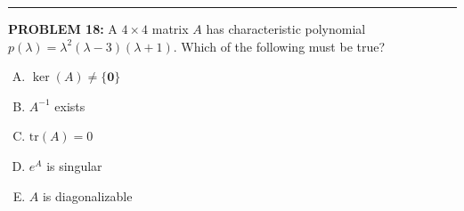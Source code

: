 \documentclass[12pt]{amsart}
\newcommand{\divider}{
  \vspace{-1em} %
  \noindent
  \raisebox{-0.15ex}{\textbullet}%
  \hspace{0.5em}%
  \rule[0.5ex]{0.95\textwidth}{1.0pt}%
  \hspace{0.5em}%
  \raisebox{-0.15ex}{\textbullet}%
  \vspace{0em} %
}
\begin{document}
%
%
%
%
%
%
%
%


\divider


{\bf PROBLEM 18:}
%
A $4 \times 4$ matrix $A$ has characteristic polynomial $p(\lambda) = \lambda^2(\lambda - 3)(\lambda + 1)$.
%
Which of the following must be true?
%
\begin{enumerate}[(A)]
\item $\ker(A) \neq \{\mathbf{0}\}$
\item $A^{-1}$ exists
\item $\text{tr}(A) = 0$
\item $e^{A}$ is singular
\item $A$ is diagonalizable
\end{enumerate}
\end{document}
